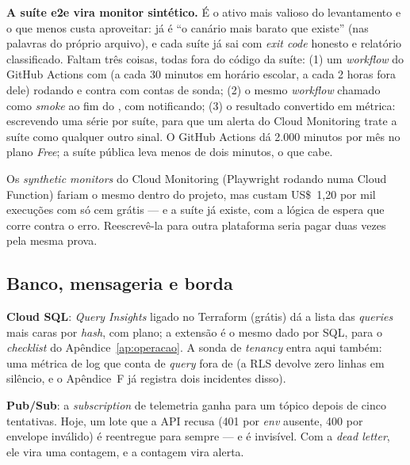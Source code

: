 \textbf{A suíte e2e vira monitor sintético.} É o ativo mais valioso do
levantamento e o que menos custa aproveitar:  já é
\enquote{o canário mais barato que existe} (nas palavras do próprio
arquivo), e cada suíte já sai com \emph{exit code} honesto e relatório
classificado. Faltam três coisas, todas fora do código da suíte: (1) um
\emph{workflow} do GitHub Actions com  (a cada 30 minutos em
horário escolar, a cada 2 horas fora dele) rodando  e
 contra  com contas de sonda; (2) o mesmo
\emph{workflow} chamado como \emph{smoke} ao fim do , com
 notificando; (3) o resultado convertido em métrica:
 escrevendo uma série  por suíte,
para que um alerta do Cloud Monitoring trate a suíte como qualquer outro
sinal. O GitHub Actions dá 2.000 minutos por mês no plano \emph{Free}; a
suíte pública leva menos de dois minutos, o que cabe.

\begin{nota}
Os \emph{synthetic monitors} do Cloud Monitoring (Playwright rodando numa
Cloud Function) fariam o mesmo dentro do projeto, mas custam US\$~1,20 por
mil execuções com só cem grátis --- e a suíte já existe, com a lógica de
espera que corre contra o erro. Reescrevê-la para outra plataforma seria
pagar duas vezes pela mesma prova.
\end{nota}

\subsection{Banco, mensageria e borda}

\textbf{Cloud SQL}: \emph{Query Insights} ligado no Terraform (grátis) dá a
lista das \emph{queries} mais caras por \emph{hash}, com plano; a extensão
 é o mesmo dado por SQL, para o \emph{checklist}
do Apêndice~\ref{ap:operacao}. A sonda de \emph{tenancy} entra aqui também:
uma métrica de log que conta  de \emph{query} fora de
 (a RLS devolve zero linhas em silêncio, e o Apêndice~F já
registra dois incidentes disso).

\textbf{Pub/Sub}: a \emph{subscription} de telemetria ganha
 para um tópico 
depois de cinco tentativas. Hoje, um lote que a API recusa (401 por
\emph{env} ausente, 400 por envelope inválido) é reentregue para sempre
--- e é invisível. Com a \emph{dead letter}, ele vira uma contagem, e a
contagem vira alerta.

